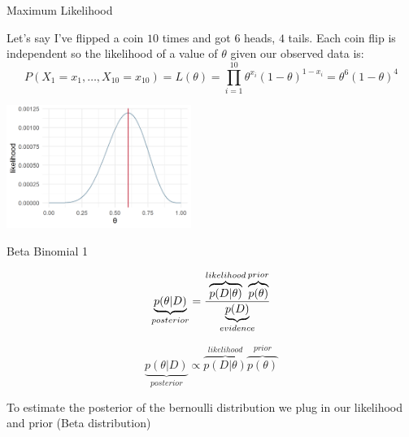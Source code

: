 \documentclass[
  ignorenonframetext,
]{beamer}
\begin{document}
\begin{frame}{Maximum Likelihood}
\protect\hypertarget{maximum-likelihood}{}

Let's say I've flipped a coin \(10\) times and got \(6\) heads, \(4\)
tails. Each coin flip is independent so the likelihood of a value of
\(\theta\) given our observed data is: \[
P(X_1 = x_1, \ldots ,X_{10} = x_{10}) = L(\theta) = \prod_{i=1}^{10}{\theta^{x_i} (1-\theta)^{1-x_i}} = \theta^{6} (1-\theta)^{4}
\]

\begin{center}\includegraphics[width=6cm,height=4cm]{figures/LikelihoodCoin} \end{center}

\end{frame}

\begin{frame}{Beta Binomial 1}
\protect\hypertarget{beta-binomial-1}{}

\begin{equation}
\underbrace{p(\theta|D)}_{posterior} = {\overbrace{p(D|\theta)}^{likelihood}
  \overbrace{p(\theta)}^{prior} \over \underbrace{p(D)}_{evidence}}
\end{equation}

\begin{equation}
\underbrace{p(\theta|D)}_{posterior}  \propto  {\overbrace{p(D|\theta)}^{likelihood}
  \overbrace{p(\theta)}^{prior}}
\end{equation}

To estimate the posterior of the bernoulli distribution we plug in our
likelihood and prior (Beta distribution)

\end{frame}
\end{document}
